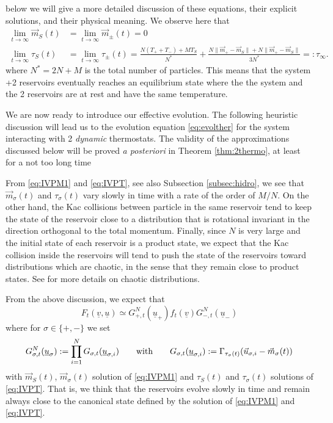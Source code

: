 \documentclass{article}
\newcommand\uv{{\underline v}}
\newcommand\uu{{\underline u}}
\newcommand\vu{{\vec u}}
\begin{document}
below we will give a more detailed discussion of these equations, their explicit solutions, and their physical meaning.
We observe here that
\begin{equation}\label{eq:infty}
\begin{aligned}
\lim_{t\to\infty}\vec 
m_S(t)&=\lim_{t\to\infty}\vec m_\pm(t)=0\\
\lim_{t\to\infty}\tau_S(t)&=\lim_{t\to\infty}\tau_\pm(t)=\frac{N(T_++T_-)+MT_S}{N^*}+\frac{N\|\vec m_+-\vec m_S\| + 
N\|\vec m_+-\vec m_S\|}{3N^*} =:\tau_\infty. 
\end{aligned}
\end{equation}
where $N^* = 2N + M$ is the total number of particles. This means that the system +2 reservoirs eventually reaches an 
equilibrium state where the the system and the 2 reservoirs are at rest and have the same temperature.

We are now ready to introduce our effective evolution. The following heuristic discussion will lead us to the evolution 
equation \eqref{eq:evolther} for the system interacting with 2 {\it dynamic} thermostats. The validity of the 
approximations discussed below will be proved {\it a posteriori} in Theorem \ref{thm:2thermo}, at least for a not too 
long time

From \eqref{eq:IVPM1} and \eqref{eq:IVPT}, see also Subsection \ref{subsec:hidro}, we see that $\vec m_\sigma(t)$ and
$\tau_\sigma(t)$ vary slowly in time with a rate of the order of $M/N$.  On the other hand, the Kac collisions between
particle in the same reservoir tend to keep the state of the reservoir close to a distribution that is rotational
invariant in the direction orthogonal to the total momentum. Finally, since $N$ is very large and the initial state of
each reservoir is a product state, we expect that the Kac collision inside the reservoirs will tend to push the state of
the reservoirs toward distributions which are chaotic, in the sense that they remain close to product states. See 
\cite{Kac} for more details on chaotic distributions.

From the above discussion, we expect that %
\begin{equation}\label{eq:appevo}
F_t(\uv,\uu)\simeq G_{+,t}^N(\uu_+)f_t(\uv)G_{-,t}^N(\uu_-)
\end{equation}
%
where for $\sigma\in\{+,-\}$ we set
%
\begin{equation}\label{eq:Gsigma}
G^N_{\sigma,t}(\uu_\sigma):=\prod_{i=1}^{N}G_{\sigma,t}(\uu_{\sigma,i})\qquad\hbox{with}\qquad 
G_{\sigma,t}(\uu_{\sigma,i}):= 
\Gamma_{\tau_\sigma(t)}(\vu_{\sigma,i}-\vec m_\sigma(t))
\end{equation}
with $\vec m_S(t)$, $\vec m_\sigma(t)$ solution of \eqref{eq:IVPM1} and $\tau_S(t)$ and $\tau_\sigma(t)$ solutions of
\eqref{eq:IVPT}. That is, we think that the reservoirs evolve slowly in time and remain always close to the canonical
state defined by the solution of \eqref{eq:IVPM1} and \eqref{eq:IVPT}.
\end{document}
